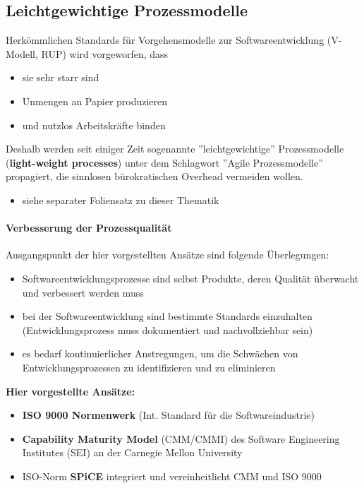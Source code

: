 \subsection{Leichtgewichtige Prozessmodelle}

Herkömmlichen Standards für Vorgehensmodelle zur Softwareentwicklung (V-Modell, RUP) wird vorgeworfen, dass
\begin{itemize}
	\item sie sehr starr sind
	\item Unmengen an Papier produzieren
	\item und nutzlos Arbeitskräfte binden
\end{itemize}
Deshalb werden seit einiger Zeit sogenannte ''leichtgewichtige'' Prozessmodelle (\textbf{light-weight processes}) unter dem Schlagwort ''Agile Prozessmodelle'' propagiert, die sinnlosen bürokratischen Overhead vermeiden wollen.
\begin{itemize}
	\item siehe separater Foliensatz zu dieser Thematik
\end{itemize}

\paragraph{Verbesserung der Prozessqualität}
Ausgangspunkt der hier vorgestellten Ansätze sind folgende Überlegungen:
\begin{itemize}
	\item Softwareentwicklungsprozesse sind selbst Produkte, deren Qualität überwacht und verbessert werden muss
	\item bei der Softwareentwicklung sind bestimmte Standards einzuhalten (Entwicklungsprozess muss dokumentiert und nachvollziehbar sein)
	\item es bedarf kontinuierlicher Anstregungen, um die Schwächen von Entwicklungsprozessen zu identifizieren und zu eliminieren
\end{itemize}


\textbf{Hier vorgestellte Ansätze:}
\begin{itemize}
	\item \textbf{ISO 9000 Normenwerk} (Int. Standard für die Softwareindustrie)
	\item \textbf{Capability Maturity Model} (CMM/CMMI) des Software Engineering 
	Institutes (SEI) an der Carnegie Mellon University
	\item ISO-Norm \textbf{SPiCE} integriert und vereinheitlicht CMM und ISO 9000
\end{itemize}

